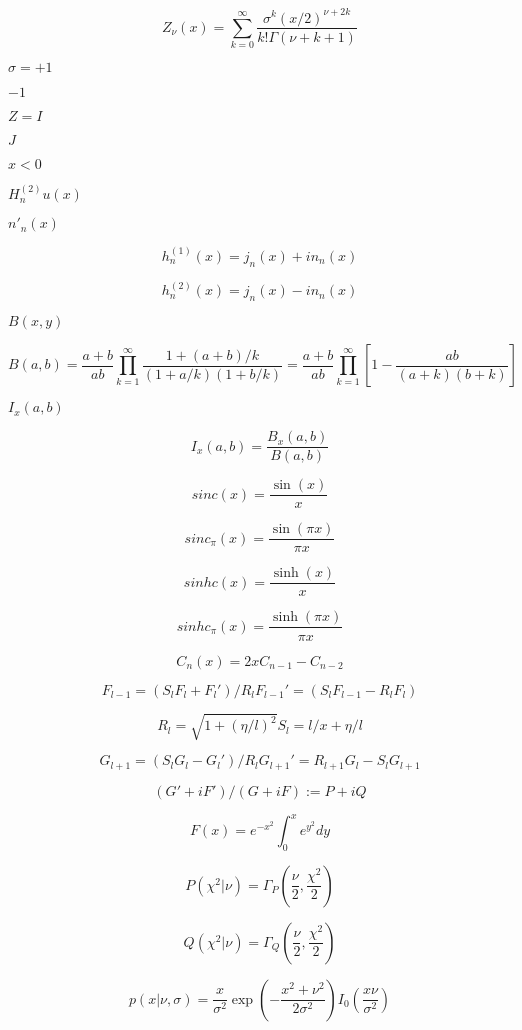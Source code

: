 \documentclass{article}
\begin{document}
\[ Z_{\nu}(x) = \sum_{k=0}^{\infty} \frac{\sigma^k (x/2)^{\nu + 2k}}{k!\Gamma(\nu+k+1)} \]
\pagebreak

$ \sigma = +1 $
\pagebreak

$ -1 $
\pagebreak

$ Z = I $
\pagebreak

$ J $
\pagebreak

$ x < 0 $
\pagebreak

$ H^{(2)}_nu(x) $
\pagebreak

$ n'_n(x) $
\pagebreak

\[ h^{(1)}_n(x) = j_n(x) + i n_n(x) \]
\pagebreak

\[ h^{(2)}_n(x) = j_n(x) - i n_n(x) \]
\pagebreak

$B(x,y)$
\pagebreak

\[ B(a,b) = \frac{a + b}{a b} \prod_{k=1}^{\infty} \frac{1 + (a + b) / k}{(1 + a / k) (1 + b / k)} = \frac{a + b}{ab} \prod_{k=1}^{\infty} \left[1 - \frac{ab}{(a + k)(b + k)}\right] \]
\pagebreak

$ I_x(a,b) $
\pagebreak

\[ I_x(a,b) = \frac{B_x(a,b)}{B(a,b)} \]
\pagebreak

\[ sinc(x) = \frac{\sin(x)}{x} \]
\pagebreak

\[ sinc_\pi(x) = \frac{\sin(\pi x)}{\pi x} \]
\pagebreak

\[ sinhc(x) = \frac{\sinh(x)}{x} \]
\pagebreak

\[ sinhc_\pi(x) = \frac{\sinh(\pi x)}{\pi x} \]
\pagebreak

\[ C_n(x) = 2xC_{n-1} - C_{n-2} \]
\pagebreak

\[ F_{l-1} = (S_l F_l + F_l') / R_l F_{l-1}' = (S_l F_{l-1} - R_l F_l) \]
\pagebreak

\[ R_l = \sqrt{1 + (\eta / l)^2} S_l = l / x + \eta / l \]
\pagebreak

\[ G_{l+1} = (S_l G_l - G_l')/R_l G_{l+1}' = R_{l+1} G_l - S_l G_{l+1} \]
\pagebreak

\[ (G' + i F') / (G + i F) := P + i Q \]
\pagebreak

\[ F(x) = e^{-x^2} \int_0^x e^{y^2} dy \]
\pagebreak

\[ P(\chi^2|\nu) = \Gamma_P(\frac{\nu}{2}, \frac{\chi^2}{2}) \]
\pagebreak

\[ Q(\chi^2|\nu) = \Gamma_Q(\frac{\nu}{2}, \frac{\chi^2}{2}) \]
\pagebreak

\[ p(x|\nu,\sigma) = \frac{x}{\sigma^2} \exp\left(-\frac{x^2+\nu^2}{2\sigma^2}\right) I_0\left(\frac{x \nu}{\sigma^2}\right) \]
\pagebreak
\end{document}
